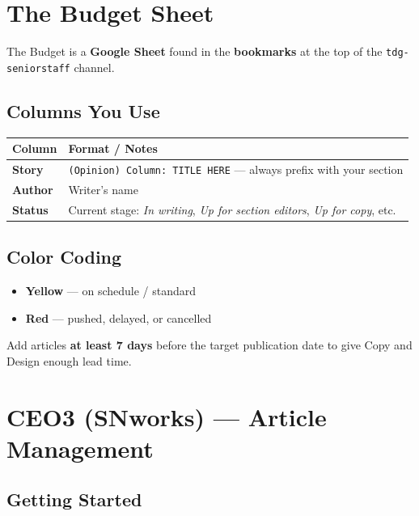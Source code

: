 \documentclass[12pt]{article}
\newlength{\tblwidth}
\begin{document}
\section{The Budget Sheet}

The Budget is a \textbf{Google Sheet} found in the \textbf{bookmarks} at the top of the \texttt{tdg-seniorstaff} channel.

\subsection{Columns You Use}

\begin{longtable}{p{0.20\tblwidth} p{0.76\tblwidth}}
\toprule
\textbf{Column} & \textbf{Format / Notes} \\
\midrule
\textbf{Story} & \texttt{(Opinion) Column: TITLE HERE} --- always prefix with your section \\
\textbf{Author} & Writer's name \\
\textbf{Status} & Current stage: \textit{In writing}, \textit{Up for section editors}, \textit{Up for copy}, etc. \\
\bottomrule
\end{longtable}

\subsection{Color Coding}

\begin{itemize}
    \item \textbf{Yellow} --- on schedule / standard
    \item \textbf{Red} --- pushed, delayed, or cancelled
\end{itemize}

Add articles \textbf{at least 7 days} before the target publication date to give Copy and Design enough lead time.

\section{CEO3 (SNworks) --- Article Management}

\subsection{Getting Started}
\end{document}
